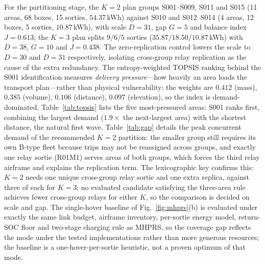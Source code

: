 \documentclass[journal]{IEEEtran}
\begin{document}
For the partitioning stage, the $K{=}2$ plan groups S001--S009, S011 and S015
(11 areas, 68 boxes, 15 sorties, $54.37$\,kWh) against S010 and S012--S014 (4
areas, 12 boxes, 5 sorties, $10.87$\,kWh), with scale $D{=}31$, gap $G{=}5$ and
balance index $J{=}0.613$; the $K{=}3$ plan splits $9/6/5$ sorties
($35.87/18.50/10.87$\,kWh) with $D{=}38$, $G{=}10$ and $J{=}0.438$. The
zero-replication control lowers the scale to $D{=}30$ and $D{=}31$
respectively, isolating cross-group relay replication as the cause of the
extra redundancy. The entropy-weighted TOPSIS ranking behind the
S001 identification measures \emph{delivery pressure}---how heavily an area
loads the transport plan---rather than physical vulnerability: the weights are
$0.412$ (mass), $0.385$ (volume), $0.106$ (distance), $0.097$ (elevation), so
the index is demand-dominated. Table~\ref{tab:topsis} lists the five
most-pressured areas: S001 ranks first, combining the largest demand
($1.9\times$ the next-largest area) with the shortest distance, the natural
first wave. Table~\ref{tab:gap} details the
peak concurrent demand of the recommended $K{=}2$ partition: the smaller group
still requires its own B-type fleet because trips may not be reassigned across
groups, and exactly one relay sortie (R01M1) serves areas of both groups, which
forces the third relay airframe and explains the replication term. The
lexicographic key confirms this: $K{=}2$ needs one unique cross-group relay
sortie and one extra replica, against three of each for $K{=}3$; no
evaluated candidate satisfying the three-area rule achieves fewer cross-group
relays for either $K$, so the comparison is decided on scale and gap. The
single-hover baseline of Fig.~\ref{fig:mhprs}(b) is evaluated under exactly
the same link budget, airframe inventory, per-sortie energy model, return-SOC
floor and two-stage charging rule as MHPRS, so the coverage gap reflects the
mode under the tested implementations rather than more generous resources; the
baseline is a one-hover-per-sortie heuristic, not a proven optimum of that mode.
\end{document}
